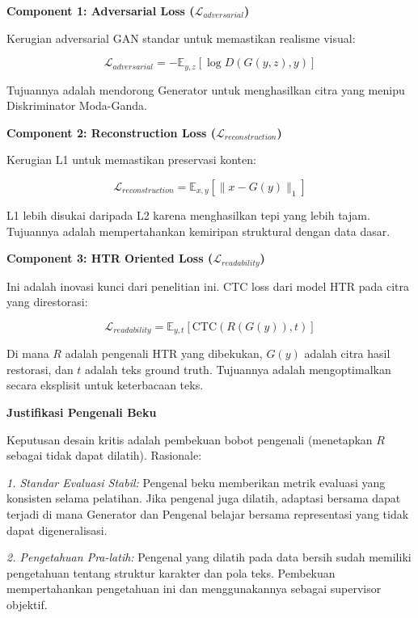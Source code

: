 \documentclass[12pt,a4paper]{article}
\begin{document}
\textbf{Component 1: Adversarial Loss ($\mathcal{L}_{adversarial}$)}

Kerugian adversarial GAN standar untuk memastikan realisme visual:

\begin{equation}
\mathcal{L}_{adversarial} = -\mathbb{E}_{y, z}[\log D(G(y, z), y)]
\end{equation}

Tujuannya adalah mendorong Generator untuk menghasilkan citra yang menipu Diskriminator Moda-Ganda.

\textbf{Component 2: Reconstruction Loss ($\mathcal{L}_{reconstruction}$)}

Kerugian L1 untuk memastikan preservasi konten:

\begin{equation}
\mathcal{L}_{reconstruction} = \mathbb{E}_{x, y}[\|x - G(y)\|_1]
\end{equation}

L1 lebih disukai daripada L2 karena menghasilkan tepi yang lebih tajam. Tujuannya adalah mempertahankan kemiripan struktural dengan data dasar.

\textbf{Component 3: HTR Oriented Loss ($\mathcal{L}_{readability}$)}

Ini adalah inovasi kunci dari penelitian ini. CTC loss dari model HTR pada citra yang direstorasi:

\begin{equation}
\mathcal{L}_{readability} = \mathbb{E}_{y, t}[\text{CTC}(R(G(y)), t)]
\end{equation}

Di mana $R$ adalah pengenali HTR yang dibekukan, $G(y)$ adalah citra hasil restorasi, dan $t$ adalah teks ground truth. Tujuannya adalah mengoptimalkan secara eksplisit untuk keterbacaan teks.

\textbf{Justifikasi Pengenali Beku}

Keputusan desain kritis adalah pembekuan bobot pengenali (menetapkan $R$ sebagai tidak dapat dilatih). Rasionale:

\textit{1. Standar Evaluasi Stabil:} Pengenal beku memberikan metrik evaluasi yang konsisten selama pelatihan. Jika pengenal juga dilatih, adaptasi bersama dapat terjadi di mana Generator dan Pengenal belajar bersama representasi yang tidak dapat digeneralisasi.

\textit{2. Pengetahuan Pra-latih:} Pengenal yang dilatih pada data bersih sudah memiliki pengetahuan tentang struktur karakter dan pola teks. Pembekuan mempertahankan pengetahuan ini dan menggunakannya sebagai supervisor objektif.
\end{document}
